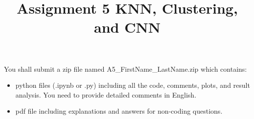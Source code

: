 \documentclass{exam}
\title{Assignment 5 KNN, Clustering, and CNN}
\date{}
\begin{document}
\maketitle
\thispagestyle{headandfoot}

\begin{center}
  {}
\end{center}
\vspace{.5cm}
\vspace{10pt}
You shall submit a zip file named A5\_FirstName\_LastName.zip which contains:

\begin{itemize}
  \item python files (.ipynb or .py) including all the code, comments, plots, and result analysis. You need to provide detailed comments in English.
   \item pdf file including explanations and answers for non-coding questions. 
\end{itemize}
\vspace{10pt}
\end{document}
